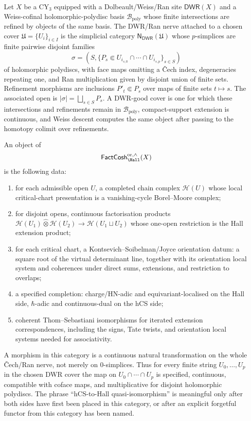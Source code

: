 \begin{definition}
\label{def:hall-valued-factorisation-cosheaf-target}
Let $X$ be a CY$_3$ equipped with a Dolbeault/Weiss/Ran site
$\mathsf{DW\!R}(X)$ and a Weiss-cofinal holomorphic-polydisc basis
$\mathcal B_{\mathrm{poly}}$ whose finite intersections are refined by
objects of the same basis. The DWR/Ran nerve attached to a chosen cover
$\mathfrak U=\{U_i\}_{i\in I}$ is the simplicial category
$\mathsf{N}_{\mathsf{DW\!R}}(\mathfrak U)$ whose $p$-simplices are
finite pairwise disjoint families
\[
 \sigma=(S,\{P_s\Subset U_{i_{s,0}}\cap\cdots\cap U_{i_{s,p}}\}_{s\in S})
\]
of holomorphic polydiscs, with face maps omitting a \v{C}ech index,
degeneracies repeating one, and Ran multiplication given by disjoint
union of finite sets. Refinement morphisms are inclusions
$P'_t\Subset P_s$ over maps of finite sets $t\mapsto s$. The associated
open is $|\sigma|=\bigsqcup_{s\in S}P_s$. A DWR-good cover is one for
which these intersections and refinements remain in
$\mathcal B_{\mathrm{poly}}$, compact-support extension is continuous,
and Weiss descent computes the same object after passing to the
homotopy colimit over refinements.

An object of
\[
 \mathsf{FactCosh}_{\Hall}^{\mathrm{or},\wedge}(X)
\]
is the following data:
\begin{enumerate}
\item for each admissible open $U$, a completed chain complex
$\mathcal H(U)$ whose local critical-chart presentation is a
vanishing-cycle Borel--Moore complex;
\item for disjoint opens, continuous factorisation products
$\mathcal H(U_1)\widehat\otimes\mathcal H(U_2)\to
\mathcal H(U_1\sqcup U_2)$ whose one-open restriction is the Hall
extension product;
\item for each critical chart, a Kontsevich--Soibelman/Joyce
orientation datum: a square root of the virtual determinant line,
together with its orientation local system and coherences under direct
sums, extensions, and restriction to overlaps;
\item a specified completion: charge/HN-adic and equivariant-localised
on the Hall side, $\hbar$-adic and continuous-dual on the hCS side;
\item coherent Thom--Sebastiani isomorphisms for iterated extension
correspondences, including the signs, Tate twists, and orientation
local systems needed for associativity.
\end{enumerate}
A morphism in this category is a continuous natural transformation on
the whole \v{C}ech/Ran nerve, not merely on $0$-simplices. Thus for
every finite string $U_0,\ldots,U_p$ in the chosen DWR cover the map on
$U_0\cap\cdots\cap U_p$ is specified, continuous, compatible with
coface maps, and multiplicative for disjoint holomorphic polydiscs.
The phrase ``hCS-to-Hall quasi-isomorphism'' is meaningful only after
both sides have first been placed in this category, or after an
explicit forgetful functor from this category has been named.
\end{definition}


